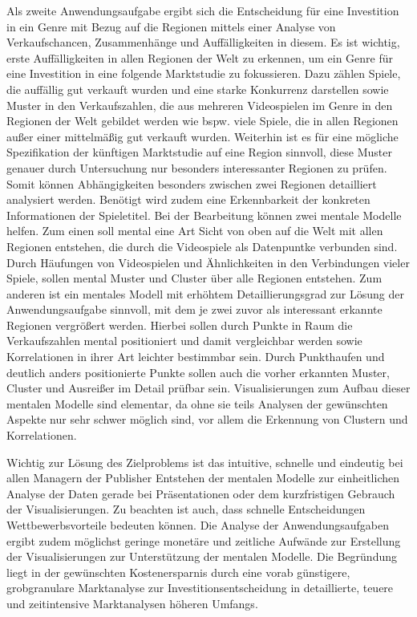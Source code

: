 \documentclass[usegeometry=true]{scrartcl}
\begin{document}
Als zweite Anwendungsaufgabe ergibt sich die Entscheidung für eine Investition in ein Genre mit Bezug auf die Regionen mittels einer Analyse von Verkaufschancen, Zusammenhänge und Auffälligkeiten in diesem.
Es ist wichtig, erste Auffälligkeiten in allen Regionen der Welt zu erkennen, um ein Genre für eine Investition in eine folgende Marktstudie zu fokussieren.
Dazu zählen Spiele, die auffällig gut verkauft wurden und eine starke Konkurrenz darstellen sowie Muster in den Verkaufszahlen, die aus mehreren Videospielen im Genre in den Regionen der Welt gebildet werden wie bspw. viele Spiele, die in allen Regionen außer einer mittelmäßig gut verkauft wurden.
Weiterhin ist es für eine mögliche Spezifikation der künftigen Marktstudie auf eine Region sinnvoll, diese Muster genauer durch Untersuchung nur besonders interessanter Regionen zu prüfen. 
Somit können Abhängigkeiten besonders zwischen zwei Regionen detailliert analysiert werden. 
Benötigt wird zudem eine Erkennbarkeit der konkreten Informationen der Spieletitel. 
Bei der Bearbeitung können zwei mentale Modelle helfen.
Zum einen soll mental eine Art Sicht von oben auf die Welt mit allen Regionen entstehen, die durch die Videospiele als Datenpuntke verbunden sind. 
Durch Häufungen von Videospielen und Ähnlichkeiten in den Verbindungen vieler Spiele, sollen mental Muster und Cluster über alle Regionen entstehen.
Zum anderen ist ein mentales Modell mit erhöhtem Detaillierungsgrad zur Lösung der Anwendungsaufgabe sinnvoll, mit dem je zwei zuvor als interessant erkannte Regionen vergrößert werden. 
Hierbei sollen durch Punkte in Raum die Verkaufszahlen mental positioniert und damit vergleichbar werden sowie Korrelationen in ihrer Art leichter bestimmbar sein. 
Durch Punkthaufen und deutlich anders positionierte Punkte sollen auch die vorher erkannten Muster, Cluster und Ausreißer im Detail prüfbar sein. %
Visualisierungen zum Aufbau dieser mentalen Modelle sind elementar, da ohne sie teils Analysen der gewünschten Aspekte nur sehr schwer möglich sind, vor allem die Erkennung von Clustern und Korrelationen.

Wichtig zur Lösung des Zielproblems ist das intuitive, schnelle und eindeutig bei allen Managern der Publisher Entstehen der mentalen Modelle zur einheitlichen Analyse der Daten gerade bei Präsentationen oder dem kurzfristigen Gebrauch der Visualisierungen.
Zu beachten ist auch, dass schnelle Entscheidungen Wettbewerbsvorteile bedeuten können.
Die Analyse der Anwendungsaufgaben ergibt zudem möglichst geringe monetäre und zeitliche Aufwände zur Erstellung der Visualisierungen zur Unterstützung der mentalen Modelle.
Die Begründung liegt in der gewünschten Kostenersparnis durch eine vorab günstigere, grobgranulare Marktanalyse zur Investitionsentscheidung in detaillierte, teuere und zeitintensive Marktanalysen höheren Umfangs.
\end{document}
